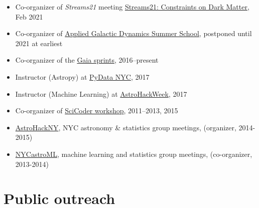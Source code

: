 \documentclass[12pt, letterpaper]{apw-cv}
\begin{document}
\begin{itemize}
    \item Co-organizer of \textit{Streams21} meeting \href{https://stellarstreams.org/streams21}{Streams21: Constraints on Dark Matter}, Feb 2021
    \item Co-organizer of \href{http://galacticdynamics.nyc/}{Applied Galactic Dynamics Summer School}, postponed until 2021 at earliest
    \item Co-organizer of the \href{http://gaia.lol}{Gaia sprints}, 2016--present
    \item Instructor (Astropy) at \href{http://pydata.org/nyc2017}{PyData NYC}, 2017
    \item Instructor (Machine Learning) at \href{http://astrohackweek.org}{AstroHackWeek}, 2017
    \item Co-organizer of \href{http://scicoder.org}{SciCoder workshop}, 2011--2013, 2015
    \item \href{https://groups.google.com/forum/#!forum/astrohackny}{AstroHackNY}, NYC astronomy \& statistics group meetings, (organizer, 2014-2015)
    \item \href{https://github.com/adrn/nycastroml}{NYCastroML}, machine learning and statistics group meetings, (co-organizer, 2013-2014)
\end{itemize}

\section*{Public outreach}
\end{document}
